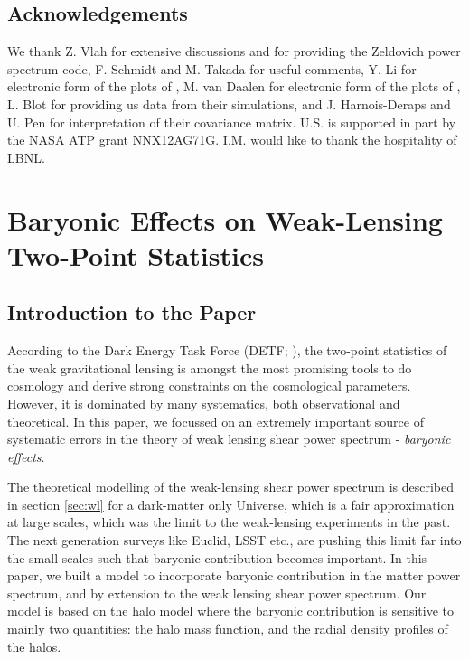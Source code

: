 \documentclass[
  11pt,
  twoside,
  openright,
  titlepage,
  headings=optiontoheadandtoc
]{scrbook}
\begin{document}
\section{Acknowledgements}
We thank Z. Vlah for extensive discussions and for providing the Zeldovich power spectrum code, F. Schmidt and M. Takada for
useful comments, Y. Li for electronic form of the plots of \cite{2014PhRvD..89h3519L}, M. van Daalen for electronic form of the plots of \cite{2011MNRAS.415.3649V}, L. Blot for providing us data from their simulations, and J. Harnois-Deraps and U. Pen for interpretation of their covariance matrix.
U.S. is supported in part by the NASA ATP grant NNX12AG71G. I.M. would like to thank the hospitality of LBNL.




\chapter{Baryonic Effects on Weak-Lensing Two-Point Statistics}
\label{p3:chap:baryonic-effects}

\section{Introduction to the Paper}

According to the Dark Energy Task Force (DETF; \cite{2006astro.ph..9591A}), 
the two-point statistics of the weak gravitational lensing is amongst the most promising
tools to do cosmology and derive strong constraints on the cosmological parameters. 
However, it is dominated by many systematics, both observational and theoretical.
In this paper, we focussed on an extremely important source of systematic errors in the 
theory of weak lensing shear power spectrum - {\it baryonic effects}. 

The theoretical modelling of the weak-lensing shear power spectrum
is described in section \ref{sec:wl} for a dark-matter only Universe, 
which is a fair approximation
at large scales, which was the limit to the weak-lensing experiments in the past. 
The next generation surveys like Euclid, LSST etc., 
are pushing this limit far into the small scales such
that baryonic contribution becomes important. In this paper, we built a model
to incorporate baryonic contribution in the matter power spectrum,
and by extension to the weak lensing shear power spectrum. Our model is based on 
the halo model where the baryonic contribution is sensitive to mainly two quantities: 
the halo mass function, and the radial density profiles of the halos.
\end{document}
